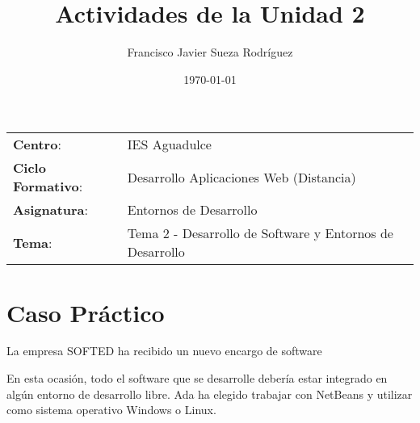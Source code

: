 


\title{
    \vspace{10ex}
    \normalfont \normalsize
    \huge \textbf{Actividades de la Unidad 2}
}
\author{Francisco Javier Sueza Rodríguez}
\date{\normalsize\today}



\maketitle

\thispagestyle{empty}

\vspace{75ex}

\begin{center}
    \begin{tabular}{l l}
        \textbf{Centro}: & IES Aguadulce \\
        \textbf{Ciclo Formativo}: & Desarrollo Aplicaciones Web (Distancia)\\
        \textbf{Asignatura}: & Entornos de Desarrollo\\
       \textbf{Tema}: & Tema 2 - Desarrollo de Software y Entornos de Desarrollo\\
    \end{tabular}
\end{center}

\newpage

\tableofcontents

\newpage

\vspace{2.5ex}

\listoffigures

\newpage

\section{Caso Práctico}
La empresa SOFTED ha recibido un nuevo encargo de software

En esta ocasión, todo el software que se desarrolle debería estar integrado en algún entorno de desarrollo libre. Ada ha elegido trabajar con NetBeans y utilizar como sistema operativo Windows o Linux.

